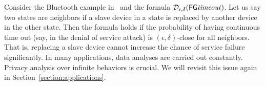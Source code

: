 Consider the Bluetooth example in~\cite{DKNP04} and the
formula $\mathcal{D}_{{\epsilon}, {\delta}}{(\mathsf{F} \mathsf{G} \mathit{timeout})}$. Let us say
two states are neighbors if a slave device in a state is replaced by
another device in the other state.
Then the formula holds if the probability of having
continuous time out (say, in the denial of service attack) is
$(\epsilon, \delta)$-close for all neighbors. That is, replacing a slave
device cannot increase the chance of service failure significantly.
In many applications, data analyses are carried out constantly. 
Privacy analysis over infinite behaviors is crucial. 
We will revisit this issue again in
Section~\ref{section:applications}. 